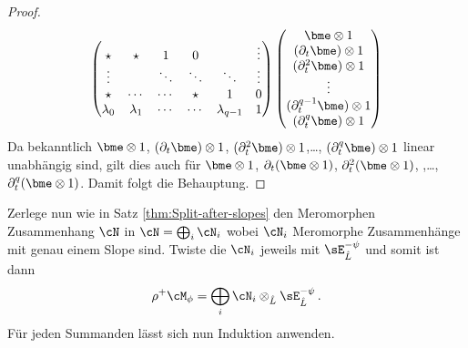 \begin{proof}
\[\begin{pmatrix}
\star     & \star     & 1      & 0      &               & \vdots\\
\vdots    &           & \ddots & \ddots & \ddots        & \vdots\\
\star     & \cdots    & \cdots & \star  & 1             & 0\\
\lambda_0 & \lambda_1 & \cdots & \cdots & \lambda_{q-1} & 1\\
\end{pmatrix}
\begin{pmatrix}
\bme\otimes 1\\
(\partial_t \bme)\otimes 1\\
(\partial_t^{2}\bme)\otimes 1\\
\vdots\\
(\partial_t^{q-1}\bme)\otimes 1\\
(\partial_t^{q}\bme)\otimes 1\\
\end{pmatrix}
\]
Da bekanntlich $\bme\otimes1$, $(\partial_t \bme)\otimes 1$,
$(\partial_t^{2}\bme)\otimes 1$,\dots, $(\partial_t^{q}\bme)\otimes 1$ linear
unabhängig sind, gilt dies auch für $\bme\otimes 1$, $\partial_t(\bme\otimes
1)$, $\partial_t^2(\bme\otimes 1)$, ,\dots, $\partial_t^{q}(\bme\otimes 1)$.
Damit folgt die Behauptung.
\end{proof}
\begin{comment}
\begin{lem}
\cite[Seite 44]{DiplHedwig}
Wenn $\rho^+\cM_\phi=\cD_{\hat L}/\cD_{\hat
L}\cdot(\rho^*P_{\phi}(t,\partial_t))$ gilt, so ist
\begin{align*}
\cN\bydef\rho^+\cM_\phi\otimes\sE_{\hat L}^\psi
  &=\cD_{\hat L}/\cD_{\hat
    L}\cdot(\rho^*P_{\phi}(t,\partial_t+\frac{\beta}{t^{\lambda+1}}))
\\&=\cD_{\hat L}/\cD_{\hat L}\cdot
    (t^{q+2}(\partial_t+\frac{\beta}{t^{\lambda+1}}))^{q}
    (t(\partial_x+\frac{\beta}{t^{\lambda+1}})-(q+1))+(q+1)qa
\end{align*}
\end{lem}
\end{comment}
Zerlege nun wie in  Satz \ref{thm:Split-after-slopes} den Meromorphen
Zusammenhang $\cN$ in $\cN=\bigoplus_i\cN_i$ wobei $\cN_i$ Meromorphe
Zusammenhänge mit genau einem Slope sind.
Twiste die $\cN_i$ jeweils mit $\sE^{-\psi}_{\hat L}$ und somit ist dann
\[
\rho^+\cM_{\phi}=\bigoplus_i\cN_i\otimes_{\hat L}\sE^{-\psi}_{\hat L} \,.
\]
Für jeden Summanden lässt sich nun Induktion anwenden.

